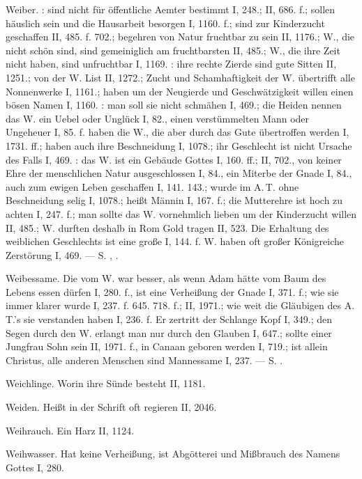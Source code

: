 Weiber. : sind nicht für öffentliche Aemter bestimmt I, 248.; II, 686. f.; sollen häuslich sein und die Hausarbeit besorgen I, 1160. f.; sind zur Kinderzucht geschaffen II, 485. f. 702.; begehren von Natur fruchtbar zu sein II, 1176.; W., die nicht schön sind, sind gemeiniglich am fruchtbarsten II, 485.; W., die ihre Zeit nicht haben, sind unfruchtbar I, 1169. : ihre rechte Zierde sind gute Sitten II, 1251.; von der W. List II, 1272.; Zucht und Schamhaftigkeit der W. übertrifft alle Nonnenwerke I, 1161.; haben um der Neugierde und Geschwätzigkeit willen einen bösen Namen I, 1160. : man soll sie nicht schmähen I, 469.; die Heiden nennen das W. ein Uebel oder Unglück I, 82., einen verstümmelten Mann oder Ungeheuer I, 85. f.  haben die W., die aber durch das Gute übertroffen werden I, 1731. ff.; haben auch ihre Beschneidung I, 1078.; ihr Geschlecht ist nicht Ursache des Falls I, 469. : das W. ist ein Gebäude Gottes I, 160. ff.; II, 702., von keiner Ehre der menschlichen Natur ausgeschlossen I, 84., ein Miterbe der Gnade I, 84., auch zum ewigen Leben geschaffen I, 141. 143.; wurde im A.\,T. ohne Beschneidung selig I, 1078.; heißt Männin I, 167. f.; die Mutterehre ist hoch zu achten I, 247. f.; man sollte das W. vornehmlich lieben um der Kinderzucht willen II, 485.; W. durften deshalb in Rom Gold tragen II, 523. Die Erhaltung des weiblichen Geschlechts ist eine große  I, 144. f. W. haben oft großer Königreiche Zerstörung  I, 469. — S. , .

Weibessame. Die  vom W. war besser, als wenn Adam hätte vom Baum des Lebens essen dürfen I, 280. f., ist eine Verheißung der Gnade I, 371. f.; wie sie immer klarer wurde I, 237. f. 645. 718. f.; II, 1971.; wie weit die Gläubigen des A.\,T.’s sie verstanden haben I, 236. f. Er zertritt der Schlange Kopf I, 349.; den Segen durch den W. erlangt man nur durch den Glauben I, 647.; sollte einer Jungfrau Sohn sein II, 1971. f., in Canaan geboren werden I, 719.; ist allein Christus, alle anderen Menschen sind Mannessame I, 237. — S. .

Weichlinge. Worin ihre Sünde besteht II, 1181.

Weiden. Heißt in der Schrift oft regieren II, 2046.

Weihrauch. Ein Harz II, 1124.

Weihwasser. Hat keine Verheißung, ist Abgötterei und Mißbrauch des Namens Gottes I, 280.

